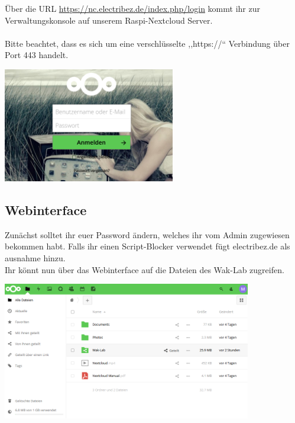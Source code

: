 Über die URL \url{https://nc.electribez.de/index.php/login} kommt ihr zur Verwaltungskonsole auf unserem Raspi-Nextcloud Server. \\
\ \\
Bitte beachtet, dass es sich um eine verschlüsselte ,,https://`` Verbindung über Port 443 handelt.\\

\begin{minipage}[t]{\textwidth}
  \centering
  \includegraphics[height=5cm]{pictures/Nextcloudlogin.png}
  \label{img:Nextcloudlogin}
\end{minipage}

\subsection{Webinterface}
Zunächst solltet ihr euer Password ändern, welches ihr vom Admin zugewiesen bekommen habt. Falls ihr einen Script-Blocker verwendet fügt electribez.de als ausnahme hinzu.\\
Ihr könnt nun über das Webinterface auf die Dateien des Wak-Lab zugreifen.\\
 
\begin{minipage}[t]{\textwidth}
  \centering
  \includegraphics[height=6cm]{pictures/NextcloudWebinterface.png}
  \label{img:NextcloudWebinterface}
\end{minipage}


